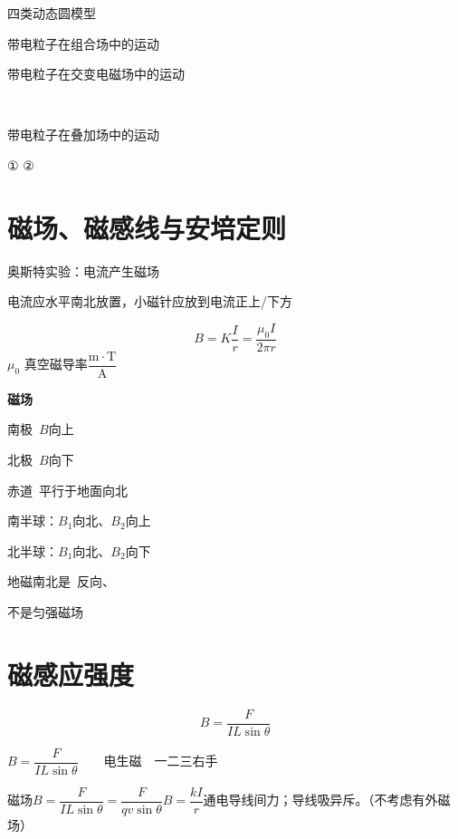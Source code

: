 
四类动态圆模型

带电粒子在组合场中的运动


带电粒子在交变电磁场中的运动

\ 

带电粒子在叠加场中的运动

① ②


\section{磁场、磁感线与安培定则}
奥斯特实验：电流产生磁场

电流应水平南北放置，小磁针应放到电流正上/下方

\[
B=K\frac{I}{r}=\frac{\mu_0 I}{2\pi r}
\]
$\mu_0$ 真空磁导率\quad $\dfrac{\mathrm{m\cdot T}}{\mathrm{A}}$

\textbf{磁场}

南极\ $B$向上

北极\ $B$向下

赤道\ 平行于地面向北

南半球：$B_1$向北、$B_2$向上

北半球：$B_1$向北、$B_2$向下

地磁南北是\ 反向、

不是匀强磁场


\section{磁感应强度}
\[
B=\frac{F}{IL\sin\theta}
\]

\noindent $B=\dfrac{F}{IL\sin\theta}$　　电生磁　一二三右手%

磁场\quad $B=\dfrac{F}{IL\sin\theta}=\dfrac{F}{qv\sin\theta}$\qquad $B=\dfrac{kI}{r}$\quad 通电导线间力；导线吸异斥。（不考虑有外磁场）

